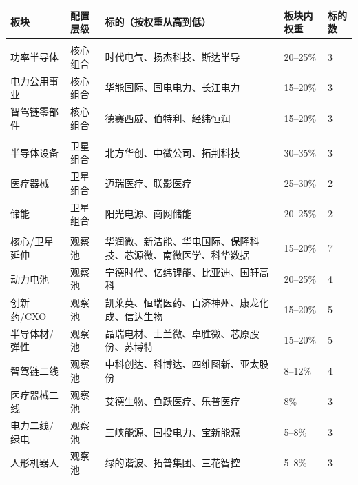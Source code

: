 \begin{exhibitbox}[表8B-20：各板块配置层级与权重建议总览]
\centering
\small
\setlength{\tabcolsep}{3pt}
\begin{tabularx}{\linewidth}{L{2.4cm} C{1.6cm} X C{1.4cm} C{1.2cm}}
\toprule
\textbf{板块} & \textbf{配置层级} & \textbf{标的（按权重从高到低）} & \textbf{板块内权重} & \textbf{标的数} \\
\midrule
{}
 \\
功率半导体 & 核心组合 & 时代电气、扬杰科技、斯达半导 & 20--25\% & 3 \\
电力公用事业 & 核心组合 & 华能国际、国电电力、长江电力 & 15--20\% & 3 \\
智驾链零部件 & 核心组合 & 德赛西威、伯特利、经纬恒润 & 15--20\% & 3 \\
\midrule
{}
 \\
半导体设备 & 卫星组合 & 北方华创、中微公司、拓荆科技 & 30--35\% & 3 \\
医疗器械 & 卫星组合 & 迈瑞医疗、联影医疗 & 25--30\% & 2 \\
储能 & 卫星组合 & 阳光电源、南网储能 & 20--25\% & 2 \\
\midrule
{}
 \\
核心/卫星延伸 & 观察池 & 华润微、新洁能、华电国际、保隆科技、芯源微、南微医学、科华数据 & 15--20\% & 7 \\
动力电池 & 观察池 & 宁德时代、亿纬锂能、比亚迪、国轩高科 & 20--25\% & 4 \\
创新药/CXO & 观察池 & 凯莱英、恒瑞医药、百济神州、康龙化成、信达生物 & 15--20\% & 5 \\
半导体材/弹性 & 观察池 & 晶瑞电材、士兰微、卓胜微、芯原股份、苏博特 & 15--20\% & 5 \\
智驾链二线 & 观察池 & 中科创达、科博达、四维图新、亚太股份 & 8--12\% & 4 \\
医疗器械二线 & 观察池 & 艾德生物、鱼跃医疗、乐普医疗 & 8\% & 3 \\
电力二线/绿电 & 观察池 & 三峡能源、国投电力、宝新能源 & 5--8\% & 3 \\
人形机器人 & 观察池 & 绿的谐波、拓普集团、三花智控 & 5--8\% & 3 \\
\bottomrule
\end{tabularx}
\end{exhibitbox}

